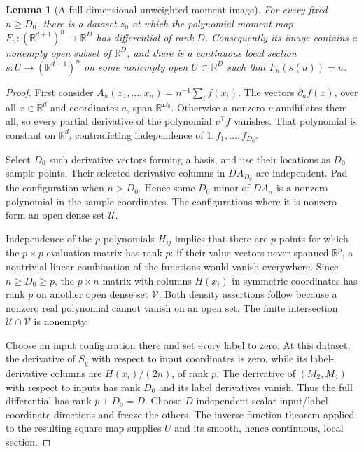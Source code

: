 \documentclass[11pt]{article}
\newtheorem{lemma}[theorem]{Lemma}
\newcommand{\R}{\mathbb R}
\begin{document}
\begin{lemma}[A full-dimensional unweighted moment image]
For every fixed $n\ge D_0$, there is a dataset $z_0$ at which the
polynomial moment map $F_n:(\R^{d+1})^n\to\R^D$ has differential of
rank $D$. Consequently its image contains a nonempty open subset of
$\R^D$, and there is a continuous local section $s:U\to(\R^{d+1})^n$
on some nonempty open $U\subset\R^D$ such that $F_n(s(u))=u$.
\end{lemma}
\begin{proof}
First consider $A_n(x_1,\ldots,x_n)=n^{-1}\sum_i f(x_i)$.
The vectors $\partial_a f(x)$, over all $x\in\R^d$ and coordinates
$a$, span $\R^{D_0}$. Otherwise a nonzero $v$ annihilates them all,
so every partial derivative of the polynomial $v^\top f$ vanishes.
That polynomial is constant on $\R^d$, contradicting independence
of $1,f_1,\ldots,f_{D_0}$.

Select $D_0$ such derivative vectors forming a basis, and use their
locations as $D_0$ sample points. Their selected derivative columns in
$DA_{D_0}$ are independent. Pad the configuration when $n>D_0$.
Hence some $D_0$-minor of $DA_n$ is a nonzero polynomial in the sample
coordinates. The configurations where it is nonzero form an open dense
set $\mathcal U$.

Independence of the $p$ polynomials $H_{ij}$ implies that there are
$p$ points for which the $p\times p$ evaluation matrix has rank $p$:
if their value vectors never spanned $\R^p$, a nontrivial linear
combination of the functions would vanish everywhere. Since $n\ge
D_0\ge p$, the $p\times n$ matrix with columns $H(x_i)$ in symmetric
coordinates has rank $p$ on another open dense set $\mathcal V$.
Both density assertions follow because a nonzero real polynomial
cannot vanish on an open set. The finite intersection
$\mathcal U\cap\mathcal V$ is nonempty.

Choose an input configuration there and set every label to zero.
At this dataset, the derivative of $S_y$ with respect to input
coordinates is zero, while its label-derivative columns are
$H(x_i)/(2n)$, of rank $p$. The derivative of $(M_2,M_4)$ with respect
to inputs has rank $D_0$ and its label derivatives vanish. Thus the
full differential has rank $p+D_0=D$. Choose $D$ independent scalar
input/label coordinate directions and freeze the others. The inverse
function theorem applied to the resulting square map supplies $U$
and its smooth, hence continuous, local section.
\end{proof}
\end{document}
